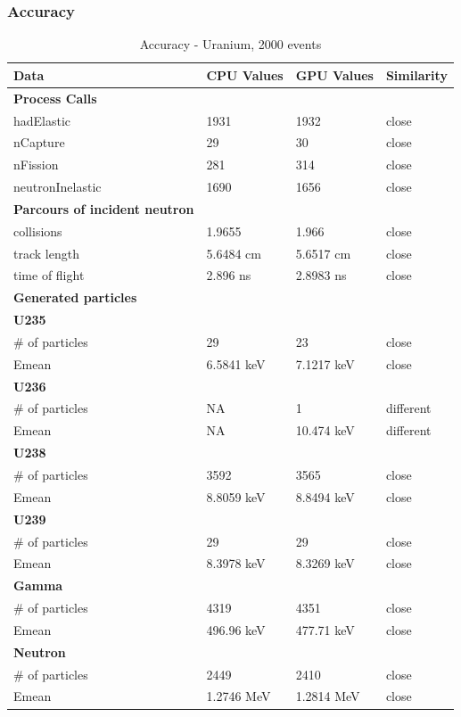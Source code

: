 \documentclass[12pt]{article}
\begin{document}
	\subsubsection{Accuracy}
		\begin{table}[H]
		\centering
		\caption{Accuracy - Uranium, 2000 events}\label{sys2Acc}
		\begin{tabular}{lp{2.3cm}p{2.3cm}l}
		\toprule
		\bf Data & CPU Values & GPU Values & Similarity\\\midrule
		\bf Process Calls&&&\\
		hadElastic&1931&1932&close\\
		nCapture&29&30&close\\
		nFission&281&314&close\\		
		neutronInelastic&1690&1656&close\\ 

		\midrule	
		\bf Parcours of incident neutron&&&\\
		collisions&1.9655&1.966&close\\
		track length&5.6484 cm&5.6517 cm&close\\
		time of flight&2.896 ns&2.8983 ns&close\\
		
		\midrule
		\bf Generated particles&&&\\
		\bf{U235}&&&\\
		\# of particles&29&23&close\\
		Emean&6.5841 keV&7.1217 keV&close\\
		
		\bf{U236}&&&\\
		\# of particles&NA&1&different\\
		Emean&NA&10.474 keV&different\\
		
		\bf{U238}&&&\\
		\# of particles&3592&3565&close\\
		Emean&8.8059 keV&8.8494 keV&close\\
		
		\bf{U239}&&&\\
		\# of particles&29&29&close\\
		Emean&8.3978 keV&8.3269 keV&close\\
		
		\bf{Gamma}&&&\\
		\# of particles&4319&4351&close\\
		Emean&496.96 keV&477.71 keV&close\\
		
		\bf{Neutron}&&&\\
		\# of particles&2449&2410&close\\
		Emean&1.2746 MeV&1.2814 MeV&close\\\bottomrule
		
		\end{tabular}
		\end{table}
		\break
\end{document}
